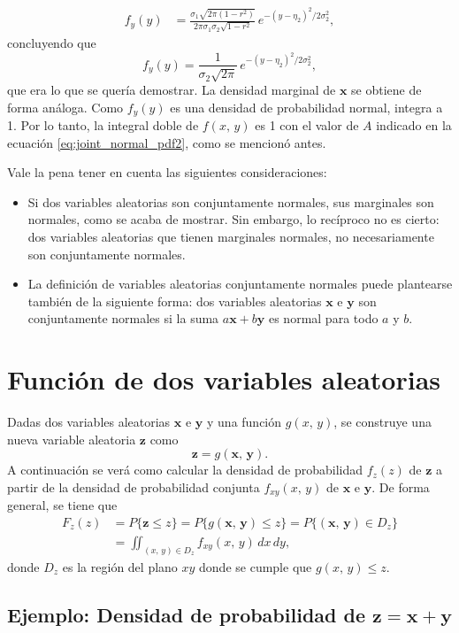 \documentclass[a4paper]{report}
\newcommand{\x}{\mathbf{x}}
\newcommand{\y}{\mathbf{y}}
\newcommand{\z}{\mathbf{z}}
\begin{document}
\begin{align*}
 f_y(y)&=\frac{\sigma_1\sqrt{2\pi(1-r^2)}}{2\pi\sigma_1\sigma_2\sqrt{1-r^2}}\,e^{-(y-\eta_2)^2/2\sigma_2^2},
\end{align*}
concluyendo que 
\[
 f_y(y)=\frac{1}{\sigma_2\sqrt{2\pi}}\,e^{-(y-\eta_2)^2/2\sigma_2^2},
\]
que era lo que se quería demostrar. La densidad marginal de \(\x\) se obtiene de forma análoga. Como \(f_y(y)\) es una densidad de probabilidad normal, integra a 1. Por lo tanto, la integral doble de \(f(x,\,y)\) es 1 con el valor de \(A\) indicado en la ecuación \ref{eq:joint_normal_pdf2}, como se mencionó antes.

Vale la pena tener en cuenta las siguientes consideraciones:
\begin{itemize}
 \item Si dos variables aleatorias son conjuntamente normales, sus marginales son normales, como se acaba de mostrar.  Sin embargo, lo recíproco no es cierto: dos variables aleatorias que tienen marginales normales, no necesariamente son conjuntamente normales.
 \item La definición de variables aleatorias conjuntamente normales puede plantearse también de la siguiente forma: dos variables aleatorias \(\x\) e \(\y\) son conjuntamente normales si la suma \(a\x+b\y\) es normal para todo \(a\) y \(b\).
\end{itemize}

\section{Función de dos variables aleatorias}

Dadas dos variables aleatorias \(\x\) e \(\y\) y una función \(g(x,\,y)\), se construye una nueva variable aleatoria \(\z\) como
\[
 \z=g(\x,\,\y).
\]
A continuación se verá como calcular la densidad de probabilidad \(f_z(z)\) de \(\z\) a partir de la densidad de probabilidad conjunta \(f_{xy}(x,\,y)\) de \(\x\) e \(\y\). De forma general, se tiene que
\begin{align}\label{eq:pdf_of_funcion_of_two_rv}
 F_z(z)&=P\{\z\leq z\}=P\{g(\x,\,\y)\leq z\}=P\{(\x,\,\y)\in D_z\}\nonumber\\
   &=\iint_{(x,\,y)\in D_z}f_{xy}(x,\,y)\,dx\,dy,
\end{align}
donde \(D_z\) es la región del plano \(xy\) donde se cumple que \(g(x,\,y)\leq z\).

\subsection{\texorpdfstring{Ejemplo: Densidad de probabilidad de \(\z=\x+\y\)}{}}\label{sec:rv_sum_density}
\end{document}
